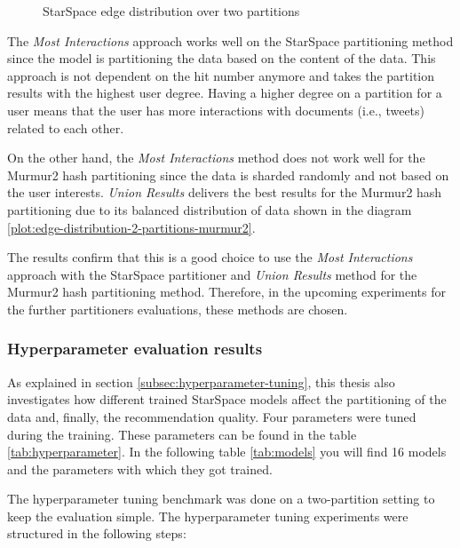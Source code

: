 \begin{figure}[!h]
    \centering
    
    \caption{StarSpace edge distribution over two partitions}
    \label{plot:star-space-edge-distribution-2-partitions}
\end{figure}


The \emph{Most Interactions} approach works well on the StarSpace partitioning method since the model is partitioning the data based on the content of the data. This approach is not dependent on the hit number anymore and takes the partition results with the highest user degree. Having a higher degree on a partition for a user means that the user has more interactions with documents (i.e., tweets) related to each other. 


On the other hand, the \emph{Most Interactions} method does not work well for the Murmur2 hash partitioning since the data is sharded randomly and not based on the user interests. \emph{Union Results} delivers the best results for the Murmur2 hash partitioning due to its balanced distribution of data shown in the diagram \ref{plot:edge-distribution-2-partitions-murmur2}. 


The results confirm that this is a good choice to use the \emph{Most Interactions} approach with the StarSpace partitioner and \emph{Union Results} method for the Murmur2 hash partitioning method. Therefore, in the upcoming experiments for the further partitioners evaluations, these methods are chosen.


\subsubsection{Hyperparameter evaluation results}
\label{subsubsec:eval-hyperparameter}
As explained in section \ref{subsec:hyperparameter-tuning}, this thesis also investigates how different trained StarSpace models affect the partitioning of the data and, finally, the recommendation quality. Four parameters were tuned during the training. These parameters can be found in the table \ref{tab:hyperparameter}. In the following table \ref{tab:models} you will find 16 models and the parameters with which they got trained.


The hyperparameter tuning benchmark was done on a two-partition setting to keep the evaluation simple. The hyperparameter tuning experiments were structured in the following steps:

